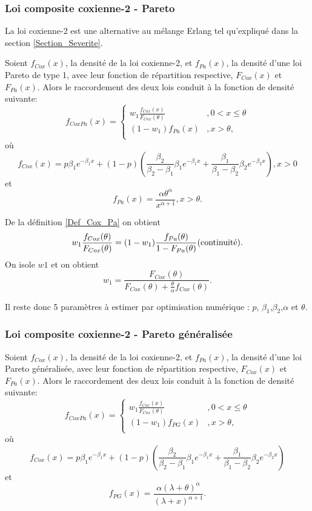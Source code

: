 	\subsubsection{Loi composite coxienne-2 - Pareto}
	La loi coxienne-2 est une alternative au mélange Erlang tel qu'expliqué dans la section \ref{Section_Severite}. 
	\begin{Definition}\label{Def_Cox_Pa}
		Soient $f_{Cox}(x)$, la densité de la loi coxienne-2, et $f_{Pa}(x)$, la densité d'une loi Pareto de type 1, avec leur fonction de répartition respective,  $F_{Cox}(x)$ et $F_{Pa}(x)$. Alors le raccordement des deux lois conduit à la fonction de densité suivante:
		$$
			f_{CoxPa}(x) = \left\{
			\begin{array}{ll}
				w_1 \frac{f_{Cox}(x)}{F_{Cox}(\theta)} & ,0 < x \leq \theta \\
				(1-w_1) {f_{Pa}(x)}& , x > \theta, \\
			\end{array}
			\right.
		$$
		où $$f_{Cox}(x)= p\beta_1 e^{-\beta_1 x} + (1-p)   \left( \frac{\beta_2 }{\beta_2 - \beta_1}\beta_1e^{-\beta_1 x} + \frac{\beta_1 }{\beta_1 - \beta_2}\beta_2e^{-\beta_2 x}\right), x>0$$ et $$ f_{Pa}(x)= \frac{\alpha \theta^{\alpha}}{x^{\alpha+1}},x>\theta. $$
	\end{Definition}
	
	De la définition \ref{Def_Cox_Pa} on obtient
	$$
	w_1 \frac{f_{Cox}(\theta)}{F_{Cox}(\theta)} = (1-w_1) \frac{f_{Pa}(\theta)}{1-F_{Pa}(\theta)}  (\textrm{continuité}). \\
	$$
	On isole $w1$ et on obtient
	$$
	w_1 = \frac{F_{Cox}(\theta)}{F_{Cox}(\theta)+ \frac{\theta}{\alpha}  f_{Cox}(\theta)}.
	$$

	Il reste donc 5 paramètres à estimer par optimisation numérique : $p$, $\beta_1$,$\beta_2$,$\alpha$ et $\theta$.

	\subsubsection{Loi composite coxienne-2 - Pareto généralisée}
	\begin{Definition}
	Soient $f_{Cox}(x)$, la densité de la loi coxienne-2, et $f_{Pa}(x)$, la densité d'une loi Pareto généralisée, avec leur fonction de répartition respective,  $F_{Cox}(x)$ et $F_{Pa}(x)$. Alors le raccordement des deux lois conduit à la fonction de densité suivante:
	$$
		f_{CoxPa}(x) = \left\{
		\begin{array}{ll}
			w_1 \frac{f_{Cox}(x)}{F_{Cox}(\theta)} & ,0 < x \leq \theta \\
			(1-w_1) {f_{PG}(x)}& ,x > \theta,  \\
		\end{array}
		\right.
	$$
	où $$f_{Cox}(x)= p\beta_1 e^{-\beta_1 x} + (1-p)   \left( \frac{\beta_2 }{\beta_2 - \beta_1}\beta_1e^{-\beta_1 x} + \frac{\beta_1 }{\beta_1 - \beta_2}\beta_2e^{-\beta_2 x}\right)$$ et $$f_{PG}(x)=\frac{\alpha (\lambda +\theta)^{\alpha}}{(\lambda + x)^{\alpha+1}}. $$
	\end{Definition}
	
